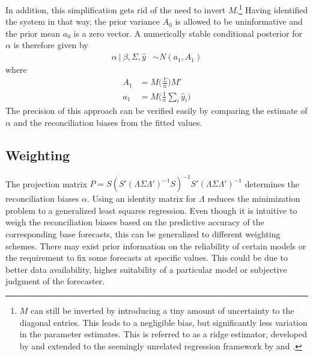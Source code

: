 \documentclass[a4paper,fleqn,11pt]{article}
\begin{document}
In addition, this simplification gets rid of the need to invert $M$.\footnote{$M$ can still be inverted by introducing a tiny amount of uncertainty to the diagonal entries. This leads to a negligible bias, but significantly less variation in the parameter estimates. This is referred to as a ridge estimator, developed by \cite{Brown1980} and extended to the seemingly unrelated regression framework by \cite{Haitovsky1987} and \cite{Firinguetti1997}.} Having identified the system in that way, the prior variance $A_0$ is allowed to be uninformative and the prior mean $a_0$ is a zero vector. A numerically stable conditional posterior for $\alpha$ is therefore given by
\begin{align}
	\label{eq:alpha}
	\alpha\ |\ \beta,\Sigma,\hat{y} &\sim N(a_1,A_1)
\end{align}
where
\begin{align*}
	A_1 &= M\Bigg(\frac{\Sigma}{n}\Bigg)M'\\
	a_1 &= M\Bigg(\frac{1}{n}\sum_i \hat{y}_i\Bigg) 
\end{align*}
The precision of this approach can be verified easily by comparing the estimate of $\alpha$ and the reconciliation biases from the fitted values. \\


\subsection{Weighting}
\label{sec:weighting}
The projection matrix $P = S(S'(\Lambda\Sigma\Lambda')^{-1}S)^{-1}S'(\Lambda\Sigma\Lambda')^{-1}$ determines the  reconciliation biases $\alpha$. Using an identity matrix for $\Lambda$ reduces the minimization problem to a generalized least squares regression. Even though it is intuitive to weigh the reconciliation biases based on the predictive accuracy of the corresponding base forecasts, this can be generalized to different weighting schemes. There may exist prior information on the reliability of certain models or the requirement to fix some forecasts at specific values. This could be due to better data availability, higher suitability of a particular model or subjective judgment of the forecaster. 
\end{document}
